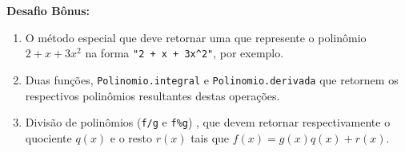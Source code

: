 \documentclass[12pt]{article}
\begin{document}
	\textbf{Desafio Bônus:}
	\begin{enumerate}
		\item O método especial  que deve retornar uma  que represente o polinômio $2 + x + 3x^{2}$ na forma \texttt{"2 + x + 3x\^{}2"}, por exemplo.
		\item Duas funções, \texttt{Polinomio.integral} e \texttt{Polinomio.derivada} que retornem os respectivos polinômios resultantes destas operações.
		
		\item Divisão de polinômios (\texttt{f/g} e \texttt{f\%g}) , que devem retornar respectivamente o quociente $q(x)$ e o resto $r(x)$ tais que $f(x) = g(x) q(x) + r(x)$.
	\end{enumerate}
	
%	
%	
%	
%	
%	
%	
%	
\end{document}
